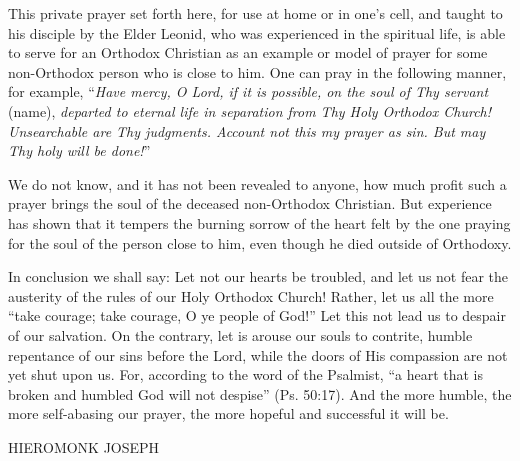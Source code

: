 This private prayer set forth here, for use at home or in one's cell, and taught to his disciple by the Elder Leonid, who was experienced in the spiritual life, is able to serve for an Orthodox Christian as an example or model of prayer for some non-Orthodox person who is close to him. One can pray in the following manner, for example, ``\textit{Have mercy, O Lord, if it is possible, on the soul of Thy servant} (name), \textit{departed to eternal life in separation from Thy Holy Orthodox Church! Unsearchable are Thy judgments. Account not this my prayer as sin. But may Thy holy will be done!}''

We do not know, and it has not been revealed to anyone, how much profit such a prayer brings the soul of the deceased non-Orthodox Christian. But experience has shown that it tempers the burning sorrow of the heart felt by the one praying for the soul of the person close to him, even though he died outside of Orthodoxy.

In conclusion we shall say: Let not our hearts be troubled, and let us not fear the austerity of the rules of our Holy Orthodox Church! Rather, let us all the more ``take courage; take courage, O ye people of God!'' Let this not lead us to despair of our salvation. On the contrary, let is arouse our souls to contrite, humble repentance of our sins before the Lord, while the doors of His compassion are not yet shut upon us. For, according to the word of the Psalmist, “a heart that is broken and humbled God will not despise” (Ps. 50:17). And the more humble, the more self-abasing our prayer, the more hopeful and successful it will be.

\hspace*{\fill}HIEROMONK JOSEPH
\bigpicgeometry
\thispagestyle{empty}
\vspace*{\fill}
\newsavebox{\stmary}
\begin{figure}[ht]
  \centering
  \label{saint-mary}
\end{figure}
\vspace*{\fill}\restoregeometry